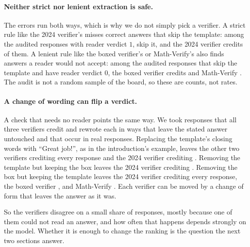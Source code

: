 \paragraph{Neither strict nor lenient extraction is safe.}
The errors run both ways, which is why we do not simply pick a verifier. A strict rule like the
2024 verifier's misses correct answers that skip the template: among the \AuditReaderCorrect{}
audited responses with reader verdict $1$, \AuditReaderCorrectNoncompliant{} skip it, and the 2024
verifier credits \AuditReaderCorrectNoncompliantEm{} of them. A lenient rule like the boxed
verifier's or Math-Verify's also finds answers a reader would not accept: among the
\AuditReaderIncorrectNoncompliant{} audited responses that skip the template and have reader verdict
$0$, the boxed verifier credits \AuditReaderIncorrectNoncompliantSb{} and Math-Verify
\AuditReaderIncorrectNoncompliantMv{}.
The audit is not a random sample of the board, so these are counts, not rates.

\paragraph{A change of wording can flip a verdict.}
A check that needs no reader points the same way. We took \PertN{} responses that all three
verifiers credit and rewrote each in ways that leave the stated answer untouched and that occur in
real responses. Replacing the template's closing words with ``Great job!'', as in the introduction's
example, leaves the other two verifiers crediting every response and the 2024 verifier crediting
\PertSignoffEm{}. Removing the template but keeping the box leaves the 2024 verifier crediting
\PertNoTemplateEm{}. Removing the box but keeping the template leaves the 2024 verifier crediting
every response, the boxed verifier \PertNoBoxSb{}, and Math-Verify \PertNoBoxMv{}. Each verifier
can be moved by a change of form that leaves the answer as it was.

So the verifiers disagree on a small share of responses, mostly because one of them could not read
an answer, and how often that happens depends strongly on the model. Whether it is enough to change
the ranking is the question the next two sections answer.
